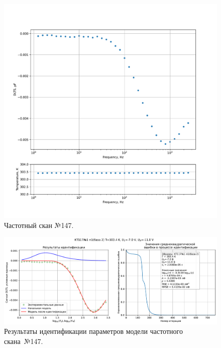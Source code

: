 \begin{figure}[!ht]
    \centering
    \includegraphics[width=1\textwidth]{../plots/КТ117№1_п1(база 2)_2500Гц-1Гц_1пФ_+30С_-7В-11В_100мВ_20мкс_шаг_0,1.pdf}
    \caption{Частотный скан №147.}
    \label{pic:frequency_scan_147}
\end{figure}

\begin{figure}[!ht]
    \centering
    \includegraphics[width=1\textwidth]{../plots/КТ117№1_п1(база 2)_2500Гц-1Гц_1пФ_+30С_-7В-11В_100мВ_20мкс_шаг_0,1_model.pdf}
    \caption{Результаты идентификации параметров модели частотного скана~№147.}
    \label{pic:frequency_scan_model147}
\end{figure}

\pagebreak


